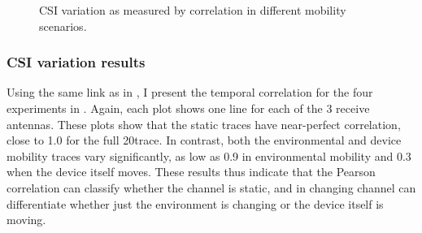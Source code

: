 \begin{figure}[htb]
	\hspace{0.06\textwidth}%
	\caption[CSI variation as measured by correlation in different mobility scenarios]{\label{fig:mobility_csi}CSI variation as measured by correlation in different mobility scenarios.}
\end{figure}

\subsubsection{CSI variation results}
Using the same link as in , I present the temporal correlation for the four experiments in . Again, each plot shows one line for each of the 3 receive antennas. These plots show that the static traces have near-perfect correlation, close to 1.0 for the full 20\s trace.  In contrast, both the environmental and device mobility traces vary significantly, as low as 0.9 in environmental mobility and 0.3 when the device itself moves. These results thus indicate that the Pearson correlation can classify whether the channel is static, and in changing channel can differentiate whether just the environment is changing or the device itself is moving.

